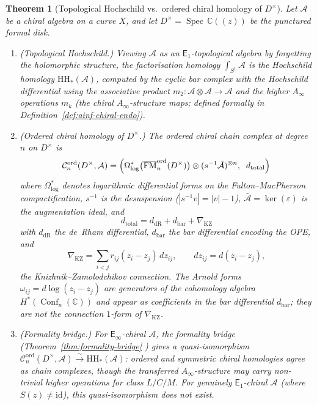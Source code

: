 \documentclass[11pt,reqno]{amsart}
\newtheorem{theorem}{Theorem}[section]
\theoremstyle{definition}
\theoremstyle{remark}
\newcommand{\cA}{\mathcal{A}}
\newcommand{\cC}{\mathcal{C}}
\newcommand{\HH}{\mathrm{HH}}
\newcommand{\Ainf}{A_{\infty}}
\newcommand{\Eone}{\mathsf{E}_{1}}
\newcommand{\Einf}{\mathsf{E}_{\infty}}
\DeclareMathOperator{\Conf}{Conf}
\DeclareMathOperator{\FM}{FM}
\DeclareMathOperator{\Spec}{Spec}
\newcommand{\CC}{\mathbb{C}}
\newcommand{\id}{\mathrm{id}}
\numberwithin{equation}{section}
\begin{document}
\begin{theorem}[Topological Hochschild vs.\ ordered
chiral homology of $D^\times$]\label{thm:hh-vs-ch}
Let $\cA$ be a chiral algebra on a curve $X$, and let
$D^\times = \Spec\, \CC((z))$ be the punctured formal disk.
\begin{enumerate}[label=\textup{(\roman*)}]
\item \textup{(Topological Hochschild.)}
  Viewing $\cA$ as an $\Eone$-topological algebra by
  forgetting the holomorphic structure, the factorisation
  homology $\int_{S^1} \cA$ is the Hochschild homology
  $\HH_*(\cA)$, computed by the cyclic bar complex with the
  Hochschild differential using the associative product
  $m_2 \colon \cA \otimes \cA \to \cA$ and the higher
  $\Ainf$ operations $m_k$ (the chiral $\Ainf$-structure
  maps; defined formally in
  Definition~\ref{def:ainf-chiral-endo}).
\item \textup{(Ordered chiral homology of $D^\times$.)}
  The ordered chiral chain complex at degree~$n$ on $D^\times$ is
  \begin{equation}\label{eq:ch-cx-Dx}
    \cC_n^{\mathrm{ord}}(D^\times, \cA)
    = \Bigl(
    \Omega^*_{\log}\bigl(
    \overline{\FM}_n^{\mathrm{ord}}(D^\times)\bigr)
    \otimes (s^{-1}\bar{\cA})^{\otimes n},
    \;\; d_{\mathrm{total}}
    \Bigr)
  \end{equation}
  where $\Omega^*_{\log}$ denotes logarithmic differential
  forms on the Fulton--MacPherson compactification,
  $s^{-1}$ is the desuspension
  \textup{(}$|s^{-1}v| = |v| - 1$\textup{)},
  $\bar{\cA} = \ker(\varepsilon)$ is the augmentation ideal,
  and
  \begin{equation}\label{eq:d-total}
    d_{\mathrm{total}}
    = d_{\mathrm{dR}}
    + d_{\mathrm{bar}}
    + \nabla_{\mathrm{KZ}}
  \end{equation}
  with $d_{\mathrm{dR}}$ the de~Rham differential,
  $d_{\mathrm{bar}}$ the bar differential encoding the OPE, and
  \begin{equation}\label{eq:kz}
    \nabla_{\mathrm{KZ}}
    = \sum_{i < j} r_{ij}(z_i - z_j) \, dz_{ij},
    \qquad
    dz_{ij} = d(z_i - z_j),
  \end{equation}
  the Knizhnik--Zamolodchikov connection.
  The Arnold forms
  $\omega_{ij} = d\log(z_i - z_j)$ are generators of the
  cohomology algebra $H^*(\Conf_n(\CC))$ and appear as
  coefficients in the bar differential $d_{\mathrm{bar}}$;
  they are \emph{not} the connection $1$-form of $\nabla_{\mathrm{KZ}}$.
\item \textup{(Formality bridge.)} For $\Einf$-chiral $\cA$,
  the formality bridge
  \textup{(}Theorem~\textup{\ref{thm:formality-bridge}}%
  \textup{)} gives a quasi-isomorphism
  $\cC_n^{\mathrm{ord}}(D^\times, \cA)
  \xrightarrow{\sim} \HH_*(\cA)$:
  ordered and symmetric chiral homologies agree as chain
  complexes, though the transferred $\Ainf$-structure may
  carry non-trivial higher operations for class $L/C/M$.
  For genuinely $\Eone$-chiral $\cA$ \textup{(}where
  $S(z) \neq \id$\textup{)}, this quasi-isomorphism does
  not exist.
\end{enumerate}
\end{theorem}
\end{document}
